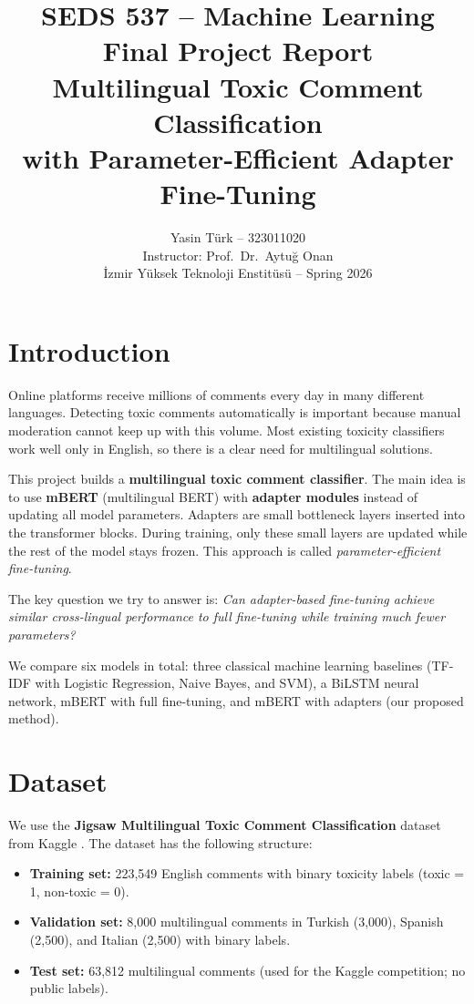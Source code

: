 \documentclass[11pt,a4paper]{article}
\title{
  \textbf{SEDS 537 -- Machine Learning}\\[4pt]
  \Large Final Project Report\\[8pt]
  \large Multilingual Toxic Comment Classification\\
  with Parameter-Efficient Adapter Fine-Tuning
}
\author{
  Yasin T\"{u}rk -- 323011020\\
  Instructor: Prof.~Dr.~Aytu\u{g} Onan\\
  \.{I}zmir Y\"{u}ksek Teknoloji Enstit\"{u}s\"{u} -- Spring 2026
}
\date{}
\begin{document}
\maketitle

\section{Introduction}

Online platforms receive millions of comments every day in many different
languages. Detecting toxic comments automatically is important because manual
moderation cannot keep up with this volume. Most existing toxicity classifiers
work well only in English, so there is a clear need for multilingual solutions.

This project builds a \textbf{multilingual toxic comment classifier}. The main
idea is to use \textbf{mBERT} (multilingual BERT) with \textbf{adapter modules}
instead of updating all model parameters. Adapters are small bottleneck layers
inserted into the transformer blocks. During training, only these small layers
are updated while the rest of the model stays frozen. This approach is called
\textit{parameter-efficient fine-tuning}.

The key question we try to answer is: \textit{Can adapter-based fine-tuning
achieve similar cross-lingual performance to full fine-tuning while training
much fewer parameters?}

We compare six models in total: three classical machine learning baselines
(TF-IDF with Logistic Regression, Naive Bayes, and SVM), a BiLSTM neural
network, mBERT with full fine-tuning, and mBERT with adapters (our proposed
method).

\section{Dataset}

We use the \textbf{Jigsaw Multilingual Toxic Comment Classification} dataset
from Kaggle \cite{jigsaw}. The dataset has the following structure:

\begin{itemize}  \item \textbf{Training set:} 223,549 English comments with binary toxicity
        labels (toxic = 1, non-toxic = 0).
  \item \textbf{Validation set:} 8,000 multilingual comments in Turkish (3,000),
        Spanish (2,500), and Italian (2,500) with binary labels.
  \item \textbf{Test set:} 63,812 multilingual comments (used for the Kaggle
        competition; no public labels).
\end{itemize}
\end{document}
